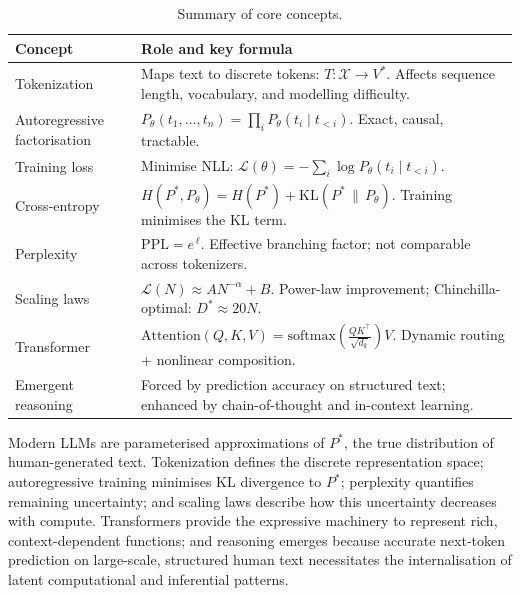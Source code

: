 \documentclass[11pt,a4paper]{article}
\theoremstyle{definition}
\theoremstyle{plain}
\newcommand{\KL}[2]{\mathrm{KL}\!\left(#1\,\|\,#2\right)}
\newcommand{\PPL}{\mathrm{PPL}}
\newcommand{\Hc}{H}
\newcommand{\tloss}{\mathcal{L}}
\begin{document}
\begin{table}[ht]
\centering
\small
\renewcommand{\arraystretch}{1.4}
\begin{tabularx}{\linewidth}{@{} l X @{}}
  \toprule
  \rowcolor{primary!15}
  \textbf{Concept} & \textbf{Role and key formula} \\
  \midrule
  Tokenization
    & Maps text to discrete tokens: $T:\mathcal{X}\to V^*$.
      Affects sequence length, vocabulary, and modelling difficulty. \\
  Autoregressive factorisation
    & $P_\theta(t_1,\dots,t_n) = \prod_i P_\theta(t_i\mid t_{<i})$.
      Exact, causal, tractable. \\
  Training loss
    & Minimise NLL: $\tloss(\theta) = -\sum_i \log P_\theta(t_i\mid t_{<i})$. \\
  Cross-entropy
    & $\Hc(P^*,P_\theta) = \Hc(P^*) + \KL{P^*}{P_\theta}$.
      Training minimises the KL term. \\
  Perplexity
    & $\PPL = e^{\,\ell}$.
      Effective branching factor; not comparable across tokenizers. \\
  Scaling laws
    & $\tloss(N)\approx AN^{-\alpha}+B$.
      Power-law improvement; Chinchilla-optimal: $D^*\approx 20N$. \\
  Transformer
    & $\mathrm{Attention}(Q,K,V)=\mathrm{softmax}\!\left(\frac{QK^\top}{\sqrt{d_k}}\right)V$.
      Dynamic routing + nonlinear composition. \\
  Emergent reasoning
    & Forced by prediction accuracy on structured text; enhanced by chain-of-thought
      and in-context learning. \\
  \bottomrule
\end{tabularx}
\caption{Summary of core concepts.}
\label{tab:synthesis}
\end{table}

\begin{synthbox}
Modern LLMs are parameterised approximations of $P^*$, the true distribution of
human-generated text.
Tokenization defines the discrete representation space; autoregressive training
minimises KL divergence to $P^*$; perplexity quantifies remaining uncertainty;
and scaling laws describe how this uncertainty decreases with compute.
Transformers provide the expressive machinery to represent rich, context-dependent
functions; and reasoning emerges because accurate next-token prediction on
large-scale, structured human text necessitates the internalisation of latent
computational and inferential patterns.
\end{synthbox}
\end{document}
